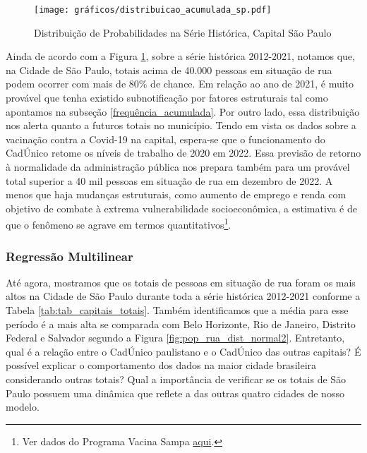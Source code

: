 \documentclass[14pt]{extarticle}
\begin{document}
\begin{figure}[bp!]
\centering
	\caption{Distribuição de Probabilidades na Série Histórica, Capital São Paulo}
	\texttt{[image: gráficos/distribuicao\_acumulada\_sp.pdf]}
	\label{fig:pop_rua_dist_prob}
\end{figure}

Ainda de acordo com a Figura \ref{fig:pop_rua_dist_prob}, sobre a série histórica 2012-2021, notamos que, na Cidade de São Paulo, totais acima de 40.000 pessoas em situação de rua podem ocorrer com mais de 80\% de chance. Em relação ao ano de 2021, é muito provável que tenha existido subnotificação por fatores estruturais tal como apontamos na subseção \ref{frequência_acumulada}. Por outro lado, essa distribuição nos alerta quanto a futuros totais no município. Tendo em vista os dados sobre a vacinação contra a Covid-19 na capital, espera-se que o funcionamento do CadÚnico retome os níveis de trabalho de 2020 em 2022. Essa previsão de retorno à normalidade da administração pública nos prepara também para um provável total superior a 40 mil pessoas em situação de rua em dezembro de 2022. A menos que haja mudanças estruturais, como aumento de emprego e renda com objetivo de combate à extrema vulnerabilidade socioeconômica, a estimativa é de que o fenômeno se agrave em termos quantitativos\footnote{Ver dados do Programa Vacina Sampa \href{https://www.prefeitura.sp.gov.br/cidade/secretarias/upload/saude/vacinometro_30_03_22.pdf}{aqui}.}.


\subsubsection{Regressão Multilinear}
\label{regressao_multilinear}

Até agora, mostramos que os totais de pessoas em situação de rua foram os mais altos na Cidade de São Paulo durante toda a série histórica 2012-2021 conforme a Tabela \ref{tab:tab_capitais_totais}. Também identificamos que a média para esse período é a mais alta se comparada com Belo Horizonte, Rio de Janeiro, Distrito Federal e Salvador segundo a Figura \ref{fig:pop_rua_dist_normal2}. Entretanto, qual é a relação entre o CadÚnico paulistano e o CadÚnico das outras capitais? É possível explicar o comportamento dos dados na maior cidade brasileira considerando outras totais? Qual a importância de verificar se os totais de São Paulo possuem uma dinâmica que reflete a das outras quatro cidades de nosso modelo.\\
\end{document}
